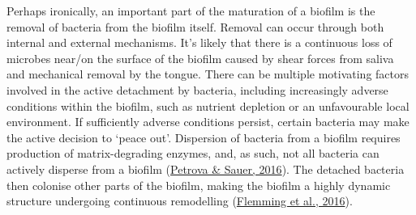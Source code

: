 \documentclass[
  b5paper,
]{book}
\begin{document}
Perhaps ironically, an important part of the maturation of a biofilm is
the removal of bacteria from the biofilm itself. Removal can occur
through both internal and external mechanisms. It's likely that there is
a continuous loss of microbes near/on the surface of the biofilm caused
by shear forces from saliva and mechanical removal by the tongue. There
can be multiple motivating factors involved in the active detachment by
bacteria, including increasingly adverse conditions within the biofilm,
such as nutrient depletion or an unfavourable local environment. If
sufficiently adverse conditions persist, certain bacteria may make the
active decision to `peace out'. Dispersion of bacteria from a biofilm
requires production of matrix-degrading enzymes, and, as such, not all
bacteria can actively disperse from a biofilm
(\protect\hyperlink{ref-petrovaEscapingBiofilm2016}{Petrova \& Sauer,
2016}). The detached bacteria then colonise other parts of the biofilm,
making the biofilm a highly dynamic structure undergoing continuous
remodelling
(\protect\hyperlink{ref-flemmingBiofilmsEmergent2016}{Flemming et al.,
2016}).
\end{document}
